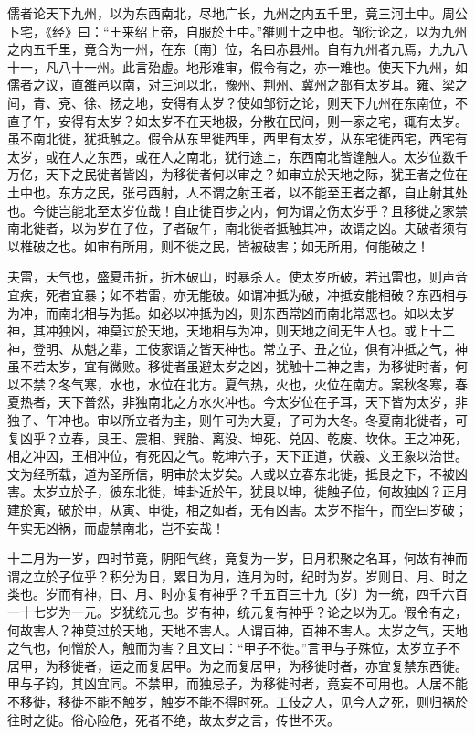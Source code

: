 \documentclass[]{article}
\begin{document}
儒者论天下九州，以为东西南北，尽地广长，九州之内五千里，竟三河土中。周公卜宅，《经》曰：``王来绍上帝，自服於土中。''雒则土之中也。邹衍论之，以为九州之内五千里，竟合为一州，在东〔南〕位，名曰赤县州。自有九州者九焉，九九八十一，凡八十一州。此言殆虚。地形难审，假令有之，亦一难也。使天下九州，如儒者之议，直雒邑以南，对三河以北，豫州、荆州、冀州之部有太岁耳。雍、梁之间，青、兗、徐、扬之地，安得有太岁？使如邹衍之论，则天下九州在东南位，不直子午，安得有太岁？如太岁不在天地极，分散在民间，则一家之宅，辄有太岁。虽不南北徙，犹抵触之。假令从东里徙西里，西里有太岁，从东宅徙西宅，西宅有太岁，或在人之东西，或在人之南北，犹行途上，东西南北皆逢触人。太岁位数千万亿，天下之民徙者皆凶，为移徙者何以审之？如审立於天地之际，犹王者之位在土中也。东方之民，张弓西射，人不谓之射王者，以不能至王者之都，自止射其处也。今徙岂能北至太岁位哉！自止徙百步之内，何为谓之伤太岁乎？且移徙之家禁南北徙者，以为岁在子位，子者破午，南北徙者抵触其冲，故谓之凶。夫破者须有以椎破之也。如审有所用，则不徙之民，皆被破害；如无所用，何能破之！

夫雷，天气也，盛夏击折，折木破山，时暴杀人。使太岁所破，若迅雷也，则声音宜疾，死者宜暴；如不若雷，亦无能破。如谓冲抵为破，冲抵安能相破？东西相与为冲，而南北相与为抵。如必以冲抵为凶，则东西常凶而南北常恶也。如以太岁神，其冲独凶，神莫过於天地，天地相与为冲，则天地之间无生人也。或上十二神，登明、从魁之辈，工伎家谓之皆天神也。常立子、丑之位，俱有冲抵之气，神虽不若太岁，宜有微败。移徙者虽避太岁之凶，犹触十二神之害，为移徙时者，何以不禁？冬气寒，水也，水位在北方。夏气热，火也，火位在南方。案秋冬寒，春夏热者，天下普然，非独南北之方水火冲也。今太岁位在子耳，天下皆为太岁，非独子、午冲也。审以所立者为主，则午可为大夏，子可为大冬。冬夏南北徙者，可复凶乎？立春，艮王、震相、巽胎、离没、坤死、兑囚、乾废、坎休。王之冲死，相之冲囚，王相冲位，有死囚之气。乾坤六子，天下正道，伏羲、文王象以治世。文为经所载，道为圣所信，明审於太岁矣。人或以立春东北徙，抵艮之下，不被凶害。太岁立於子，彼东北徙，坤卦近於午，犹艮以坤，徙触子位，何故独凶？正月建於寅，破於申，从寅、申徙，相之如者，无有凶害。太岁不指午，而空曰岁破；午实无凶祸，而虚禁南北，岂不妄哉！

十二月为一岁，四时节竟，阴阳气终，竟复为一岁，日月积聚之名耳，何故有神而谓之立於子位乎？积分为日，累日为月，连月为时，纪时为岁。岁则日、月、时之类也。岁而有神，日、月、时亦复有神乎？千五百三十九〔岁〕为一统，四千六百一十七岁为一元。岁犹统元也。岁有神，统元复有神乎？论之以为无。假令有之，何故害人？神莫过於天地，天地不害人。人谓百神，百神不害人。太岁之气，天地之气也，何憎於人，触而为害？且文曰：``甲子不徙。''言甲与子殊位，太岁立子不居甲，为移徙者，运之而复居甲。为之而复居甲，为移徙时者，亦宜复禁东西徙。甲与子钧，其凶宜同。不禁甲，而独忌子，为移徙时者，竟妄不可用也。人居不能不移徙，移徙不能不触岁，触岁不能不得时死。工伎之人，见今人之死，则归祸於往时之徙。俗心险危，死者不绝，故太岁之言，传世不灭。
\end{document}
